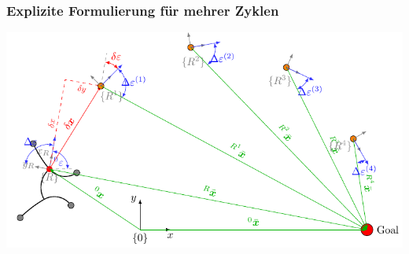 \documentclass[10pt,a4paper]{article}
\begin{document}
\subsubsection{Explizite Formulierung für mehrer Zyklen}

\includegraphics[scale=1]{pics/general_model/model_cost_2.pdf}
\end{document}
